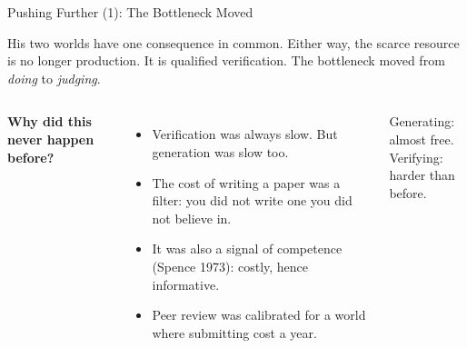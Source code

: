 \documentclass[svgnames,x11names,dvipsnames]{beamer}
\begin{document}
\begin{frame}{Pushing Further (1): The Bottleneck Moved}

His two worlds have one consequence in common.
Either way, the scarce resource is no longer production. It is \alert{qualified verification}. The bottleneck moved from \emph{doing} to \emph{judging}.

\vspace{0.2cm}

\begin{columns}[c]
\small
\textbf{Why did this never happen before?}
\begin{itemize}
    \item Verification was always slow. But generation was slow too.
    \item The cost of writing a paper was a filter: you did not write one you did not believe in.
    \item It was also a signal of competence (Spence 1973): costly, hence informative.
    \item Peer review was calibrated for a world where submitting cost a year.
\end{itemize}

\centering
{}

\vspace{0.2cm}
{\scriptsize Generating: almost free.\\ Verifying: harder than before.}
\end{columns}

\end{frame}
\end{document}
